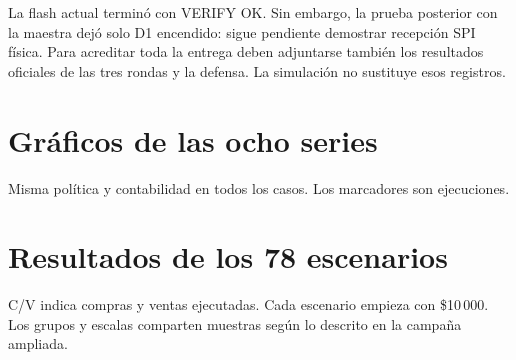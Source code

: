 \documentclass[11pt,a4paper]{article}
\begin{document}
La flash actual terminó con VERIFY OK. Sin embargo, la prueba posterior con
la maestra dejó solo D1 encendido: sigue pendiente demostrar recepción SPI
física. Para acreditar toda la entrega deben adjuntarse también los resultados
oficiales de las tres rondas y la defensa. La simulación no sustituye esos registros.

\appendix\clearpage
\clearpage\section{Gráficos de las ocho series}
Misma política y contabilidad en todos los casos. Los marcadores son ejecuciones.

\clearpage\section{Resultados de los 78 escenarios}
C/V indica compras y ventas ejecutadas. Cada escenario empieza con \$10\,000.
Los grupos y escalas comparten muestras según lo descrito en la campaña ampliada.

\end{document}
